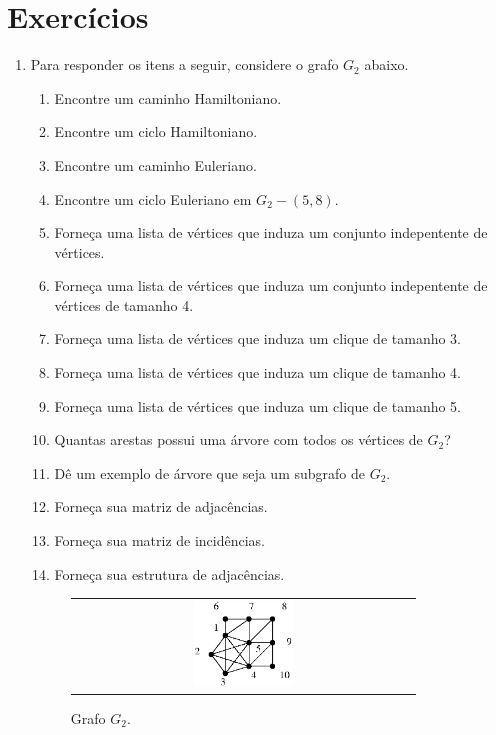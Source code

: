 \clearpage

\section{Exercícios}


\begin{enumerate}
  \item Para responder os itens a seguir, considere o grafo $G_2$ abaixo.
    \begin{enumerate}
      \item Encontre um caminho Hamiltoniano.
      \item Encontre um ciclo Hamiltoniano.
      \item Encontre um caminho Euleriano.
      \item Encontre um ciclo Euleriano em $G_2 - (5,8)$.
      \item Forneça uma lista de vértices que induza um conjunto indepentente de vértices.
      \item Forneça uma lista de vértices que induza um conjunto indepentente de vértices de tamanho 4.
      \item Forneça uma lista de vértices que induza um clique de tamanho 3.
      \item Forneça uma lista de vértices que induza um clique de tamanho 4.
      \item Forneça uma lista de vértices que induza um clique de tamanho 5.
      \item Quantas arestas possui uma árvore com todos os vértices de $G_2$?
      \item Dê um exemplo de árvore que seja um subgrafo de $G_2$.
      \item Forneça sua matriz de adjacências.
      \item Forneça sua matriz de incidências.
      \item Forneça sua estrutura de adjacências.
    \end{enumerate}

\begin{figure}[h!]
  \begin{center}
    \begin{tabular}{c}
      \includegraphics[width=0.3\textwidth]{images/02/ex01.eps}
    \end{tabular}
  \end{center}
  \caption*{\label{fig:ex:01} Grafo $G_2$.}
\end{figure}


\end{enumerate}
